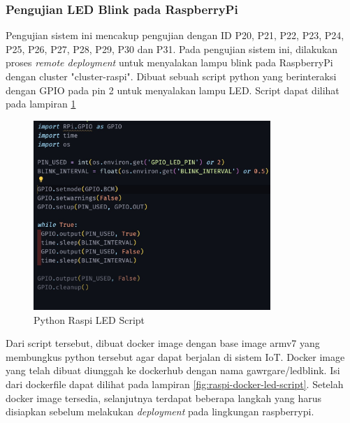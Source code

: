 \subsubsection{Pengujian LED Blink pada RaspberryPi}

Pengujian sistem ini mencakup pengujian dengan ID P20, P21, P22, P23, P24, P25, P26, P27, P28, P29, P30 dan P31. Pada pengujian sistem ini, dilakukan proses \textit{remote deployment} untuk menyalakan lampu blink pada RaspberryPi dengan cluster "cluster-raspi". Dibuat sebuah script python yang berinteraksi dengan GPIO pada pin 2 untuk menyalakan lampu LED. Script dapat dilihat pada lampiran \ref{fig:raspi-python-led-script}

\begin{figure}[htbp]
    \centering
    \includegraphics[width=0.8\textwidth]{resources/chapter-4/pengujian/pengujian-sistem-raspi-09-led.jpg}
    \caption{Python Raspi LED Script}
    \label{fig:raspi-python-led-script}
\end{figure}

Dari script tersebut, dibuat docker image dengan base image armv7 yang membungkus python tersebut agar dapat berjalan di sistem IoT. Docker image yang telah dibuat diunggah ke dockerhub dengan nama {gawrgare/led\textunderscore blink}. Isi dari dockerfile dapat dilihat pada lampiran \ref{fig:raspi-docker-led-script}. Setelah docker image tersedia, selanjutnya terdapat beberapa langkah yang harus disiapkan sebelum melakukan \textit{deployment} pada lingkungan raspberrypi.

